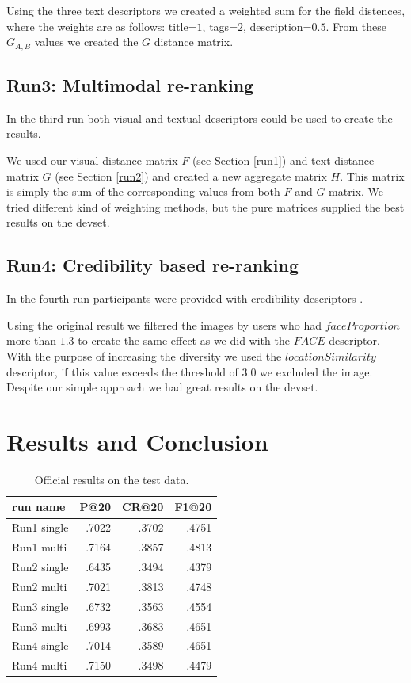 \documentclass{acm_proc_article-me}
\begin{document}
Using the three text descriptors we created a weighted sum for the field distences, where the weights are as follows: title=$1$, tags=$2$, description=$0.5$. From these $G_{A,B}$ values we created the $G$ distance matrix.

\subsection{Run3: Multimodal re-ranking}
In the third run both visual and textual descriptors could be used to create the results.

We used our visual distance matrix $F$ (see Section \ref{run1}) and text distance matrix $G$ (see Section \ref{run2}) and created a new aggregate matrix $H$. This matrix is simply the sum of the corresponding values from both $F$ and $G$ matrix. We tried different kind of weighting methods, but the pure matrices supplied the best results on the devset.

\subsection{Run4: Credibility based re-ranking}
In the fourth run participants were provided with credibility descriptors \cite{Task2015}.

Using the original result we filtered the images by users who had $faceProportion$ more than $1.3$ to create the same effect as we did with the $FACE$ descriptor. With the purpose of increasing the diversity we used the $locationSimilarity$ descriptor, if this value exceeds the threshold of $3.0$ we excluded the image. Despite our simple approach we had great results on the devset.

\section{Results and Conclusion}

\begin{table}[t]
	\centering
\begin{tabular}{|l|r|r|r|}
	\hline 
	run name & P@20 & CR@20 & F1@20\tabularnewline
	\hline 
	\hline 
	Run1 single & .7022 & .3702 & .4751\tabularnewline
	\hline 
	Run1 multi & .7164 & .3857 & .4813\tabularnewline
	\hline 
	Run2 single & .6435 & .3494 & .4379\tabularnewline
	\hline 
	Run2 multi & .7021 & .3813 & .4748\tabularnewline
	\hline 
	Run3 single & .6732 & .3563 & .4554\tabularnewline
	\hline 
	Run3 multi & .6993 & .3683 & .4651\tabularnewline
	\hline 
	Run4 single & .7014 & .3589 & .4651\tabularnewline
	\hline 
	Run4 multi & .7150 & .3498 & .4479\tabularnewline
	\hline
\end{tabular}
\label{table:results}
\caption{Official results on the test data.}
\end{table}
\end{document}
